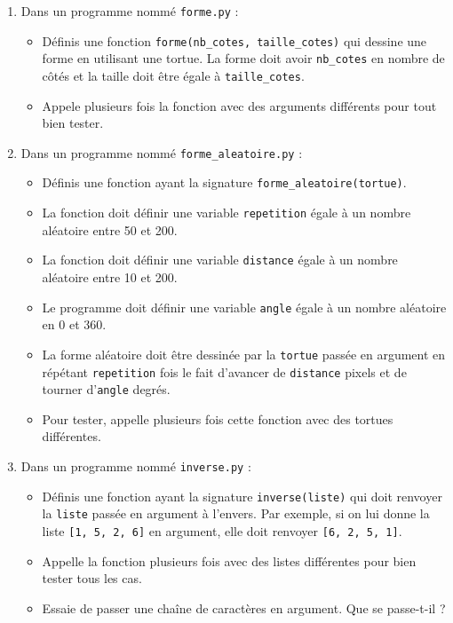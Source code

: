 \documentclass[11pt]{article}
\begin{document}
\begin{enumerate}
\item Dans un programme nommé \texttt{forme.py} :
\begin{itemize}
\item Définis une fonction \texttt{forme(nb\_cotes, taille\_cotes)} qui dessine une forme en utilisant une tortue. La forme doit avoir \texttt{nb\_cotes} en nombre de côtés et la taille doit être égale à \texttt{taille\_cotes}.
\item Appele plusieurs fois la fonction avec des arguments différents pour tout bien tester.
\end{itemize}

\item Dans un programme nommé \texttt{forme\_aleatoire.py} :
\begin{itemize}
\item Définis une fonction ayant la signature \texttt{forme\_aleatoire(tortue)}.
\item La fonction doit définir une variable \texttt{repetition} égale à un nombre aléatoire entre 50 et 200.
\item La fonction doit définir une variable \texttt{distance} égale à un nombre aléatoire entre 10 et 200.
\item Le programme doit définir une variable \texttt{angle} égale à un nombre aléatoire en 0 et 360.
\item La forme aléatoire doit être dessinée par la \texttt{tortue} passée en argument en répétant \texttt{repetition} fois le fait d'avancer de \texttt{distance} pixels et de tourner d'\texttt{angle} degrés.
\item Pour tester, appelle plusieurs fois cette fonction avec des tortues différentes.
\end{itemize}

\item Dans un programme nommé \texttt{inverse.py} :
\begin{itemize}
\item Définis une fonction ayant la signature \texttt{inverse(liste)} qui doit renvoyer la \texttt{liste} passée en argument à l'envers. Par exemple, si on lui donne la liste \texttt{[1, 5, 2, 6]} en argument, elle doit renvoyer \texttt{[6, 2, 5, 1]}.
\item Appelle la fonction plusieurs fois avec des listes différentes pour bien tester tous les cas.
\item Essaie de passer une chaîne de caractères en argument. Que se passe-t-il ?
\end{itemize}


\end{enumerate}
\end{document}
